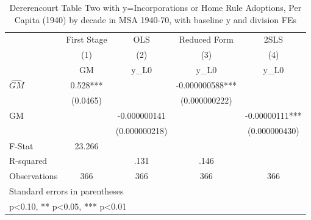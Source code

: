 \begin{table}[htbp]\centering
\def\sym#1{\ifmmode^{#1}\else\(^{#1}\)\fi}
\caption{Dererencourt Table Two with y=Incorporations or Home Rule Adoptions, Per Capita (1940) by decade in MSA 1940-70, with baseline y and division FEs}
\begin{tabular}{l*{4}{c}}
\toprule
                    & First Stage   &         OLS   &Reduced Form   &        2SLS   \\
                    &\multicolumn{1}{c}{(1)}&\multicolumn{1}{c}{(2)}&\multicolumn{1}{c}{(3)}&\multicolumn{1}{c}{(4)}\\
                    &\multicolumn{1}{c}{GM}&\multicolumn{1}{c}{y\_L0}&\multicolumn{1}{c}{y\_L0}&\multicolumn{1}{c}{y\_L0}\\
\midrule
$\hat{GM}$          &       0.528***&               &-0.000000588***&               \\
                    &    (0.0465)   &               &(0.000000222)   &               \\
\addlinespace
GM                  &               &-0.000000141   &               & -0.00000111***\\
                    &               &(0.000000218)   &               &(0.000000430)   \\
\midrule
F-Stat              &      23.266   &               &               &               \\
R-squared           &               &        .131   &        .146   &               \\
Observations        &         366   &         366   &         366   &         366   \\
\bottomrule
\multicolumn{5}{l}{\footnotesize Standard errors in parentheses}\\
\multicolumn{5}{l}{\footnotesize * p<0.10, ** p<0.05, *** p<0.01}\\
\end{tabular}
\end{table}

